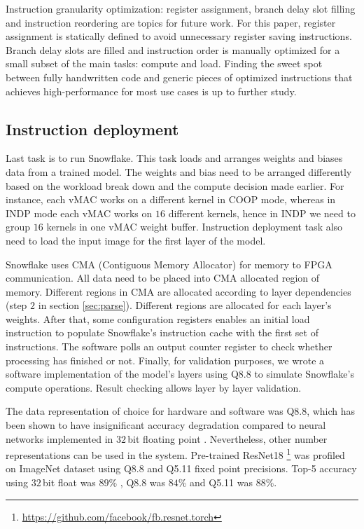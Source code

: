 \documentclass{sig-alternate}
\begin{document}

Instruction granularity optimization: register assignment, branch delay slot filling and instruction reordering are topics for future 
work. For this paper, register assignment is statically defined to avoid unnecessary register saving instructions. Branch delay slots are filled and instruction order is manually optimized for a small subset of the main tasks: compute and load. Finding the sweet spot between fully handwritten code and generic pieces of optimized instructions that achieves high-performance for most use cases is up to further study.
\vfill\null

\subsection{Instruction deployment}
Last task is to run Snowflake. This task loads and arranges weights and biases data from a trained model. The weights and bias need to be arranged differently based on the workload break down and the compute decision made earlier. For instance, each vMAC works on a different kernel in COOP mode, whereas in INDP mode each vMAC works on $16$ different kernels, hence in INDP we need to group $16$ kernels in one vMAC weight buffer. Instruction deployment task also need to load the input image for the first layer of the model.

Snowflake uses CMA (Contiguous Memory Allocator) for memory to FPGA communication. All data need to be placed into CMA allocated region of memory. Different regions in CMA are allocated according to layer dependencies (step $2$ in section \ref{sec:parse}). Different regions are allocated for each layer's weights. After that, some configuration registers enables an initial load instruction to populate Snowflake's instruction cache with the first set of instructions. The software polls an output counter register to check whether processing has finished or not. Finally, for validation purposes, we wrote a software implementation of the model's layers using Q8.8 to simulate Snowflake's compute operations. Result checking allows layer by layer validation.

The data representation of choice for hardware and software was Q8.8, which has been shown to have insignificant accuracy degradation compared to neural networks implemented in $32$\,bit floating point \cite{fixpoint}. Nevertheless, other number representations can be used in the system. Pre-trained ResNet18 \footnote{\url{https://github.com/facebook/fb.resnet.torch}} was profiled on ImageNet dataset \cite{imagenet} using Q8.8 and Q5.11 fixed point precisions. Top-5 accuracy using $32$\,bit float was $89$\% , Q8.8 was $84$\% and Q5.11 was $88\%$.
\end{document}
